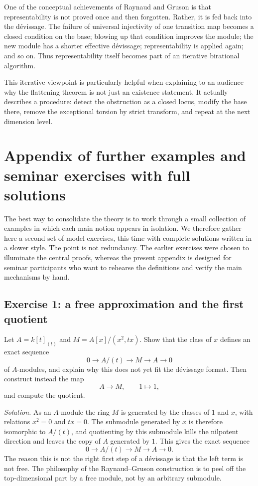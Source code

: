 \documentclass[11pt,oneside]{article}
\begin{document}
One of the conceptual achievements of Raynaud and Gruson is that representability is not proved once and then forgotten.  Rather, it is fed back into the d\'evissage.  The failure of universal injectivity of one transition map becomes a closed condition on the base; blowing up that condition improves the module; the new module has a shorter effective d\'evissage; representability is applied again; and so on.  Thus representability itself becomes part of an iterative birational algorithm.

This iterative viewpoint is particularly helpful when explaining to an audience why the flattening theorem is not just an existence statement.  It actually describes a procedure: detect the obstruction as a closed locus, modify the base there, remove the exceptional torsion by strict transform, and repeat at the next dimension level.


\section{Appendix of further examples and seminar exercises with full solutions}

The best way to consolidate the theory is to work through a small collection of examples in which each main notion appears in isolation.  We therefore gather here a second set of model exercises, this time with complete solutions written in a slower style.  The point is not redundancy.  The earlier exercises were chosen to illuminate the central proofs, whereas the present appendix is designed for seminar participants who want to rehearse the definitions and verify the main mechanisms by hand.

\subsection*{Exercise 1: a free approximation and the first quotient}

Let $A=k[t]_{(t)}$ and $M=A[x]/(x^2,tx)$.  Show that the class of $x$ defines an exact sequence
\[
0\to A/(t)\to M\to A\to 0
\]
of $A$-modules, and explain why this does not yet fit the d\'evissage format.  Then construct instead the map
\[
A\longrightarrow M,
\qquad 1\longmapsto 1,
\]
and compute the quotient.

\emph{Solution.}  As an $A$-module the ring $M$ is generated by the classes of $1$ and $x$, with relations $x^2=0$ and $tx=0$.  The submodule generated by $x$ is therefore isomorphic to $A/(t)$, and quotienting by this submodule kills the nilpotent direction and leaves the copy of $A$ generated by $1$.  This gives the exact sequence
\[
0\to A/(t)\to M\to A\to 0.
\]
The reason this is not the right first step of a d\'evissage is that the left term is not free.  The philosophy of the Raynaud--Gruson construction is to peel off the top-dimensional part by a free module, not by an arbitrary submodule.
\end{document}
